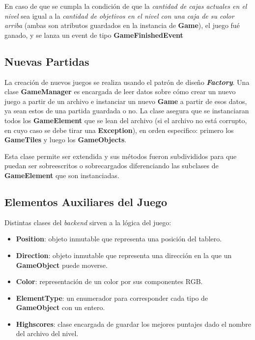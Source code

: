 \documentclass[a4paper,12pt,titlepage]{article}
\begin{document}
En caso de que se cumpla la condición de que la \emph{cantidad de cajas actuales en el nivel} sea igual a la \emph{cantidad de objetivos en el nivel con una caja de su color arriba} (ambas son atributos guardados en la instancia de \textbf{Game}), el juego fué ganado, y se lanza un event de tipo \textbf{GameFinishedEvent}

\subsection{Nuevas Partidas}

La creación de nuevos juegos se realiza usando el patrón de diseño \textbf{\emph{Factory}}. Una clase \textbf{GameManager} es encargada de leer datos sobre cómo crear un nuevo juego a partir de un archivo e instanciar un nuevo \textbf{Game} a partir de esos datos, ya sean estos de una partida guardada o no. La clase asegura que se instanciaran todos los \textbf{GameElement} que se lean del archivo (si el archivo no está corrupto, en cuyo caso se debe tirar una \textbf{Exception}), en orden especifico: primero los \textbf{GameTiles} y luego los \textbf{GameObjects}.

Esta clase permite ser extendida y sus métodos fueron subdivididos para que puedan ser sobreescritos o sobrecargados diferenciando las subclases de \textbf{GameElement} que son instanciadas. 

\subsection{Elementos Auxiliares del Juego}

Distintas clases del \emph{backend} sirven a la lógica del juego:

\begin{itemize}
    \item \textbf{Position}: objeto inmutable que representa una posición del tablero.
    \item \textbf{Direction}: objeto inmutable que representa una dirección en la que un \textbf{GameObject} puede moverse.
    \item \textbf{Color}: representación de un color por sus componentes RGB.
    \item \textbf{ElementType}: un enumerador para corresponder cada tipo de \textbf{GameObject} con un entero.
	\item \textbf{Highscores}: clase encargada de guardar los mejores puntajes dado el nombre del archivo del nivel.
\end{itemize}
\end{document}
